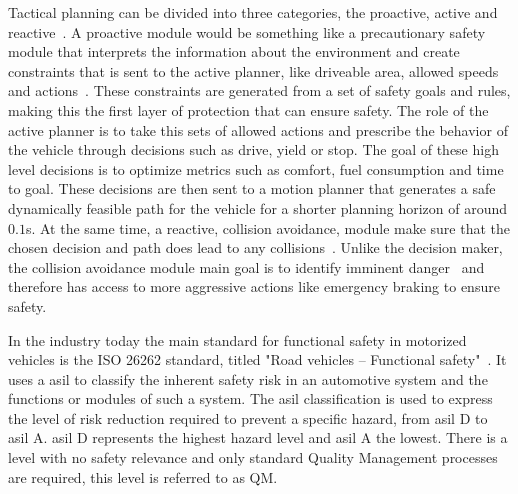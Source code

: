 Tactical planning can be divided into three categories, the proactive, active and reactive~\cite{Berntorp2018}. A proactive module would be something like a precautionary safety module that interprets the information about the environment and create constraints that is sent to the active planner, like  driveable area, allowed speeds and actions~\cite{Shiller2007}. These constraints are generated from a set of safety goals and rules, making this the first layer of protection that can ensure safety. 
The role of the active planner is to take this sets of allowed actions and prescribe the behavior of the vehicle through decisions such as drive, yield or stop. The goal of these high level decisions is to optimize metrics such as comfort, fuel consumption and time to goal. These decisions are then sent to a motion planner that generates a safe dynamically feasible path for the vehicle for a shorter planning horizon of around $0.1$s. 
At the same time, a reactive, collision avoidance, module make sure that the chosen decision and path does lead to any collisions~\cite{brannstorm2010}. Unlike the decision maker, the collision avoidance module main goal is to identify imminent danger~\cite{brannstorm2014} and therefore has access to more aggressive actions like emergency braking to ensure safety. 
 
In the industry today the main standard for functional safety in motorized vehicles is the ISO 26262 standard, titled "Road vehicles – Functional safety"~\cite{ISO26262}. It uses a \gls{asil} to classify the inherent safety risk in an automotive system and the functions or modules of such a system. The \gls{asil} classification is used to express the level of risk reduction required to prevent a specific hazard, from \gls{asil} D to \gls{asil} A. \gls{asil} D represents the highest hazard level and \gls{asil} A the lowest. There is a level with no safety relevance and only standard Quality Management processes are required, this level is referred to as QM.

